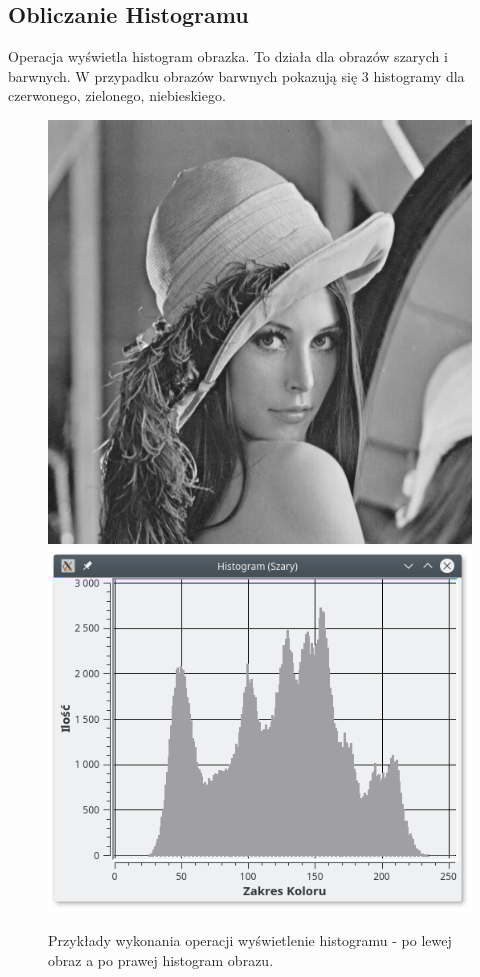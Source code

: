 \documentclass{article}
\begin{document}
\FloatBarrier
\subsection{Obliczanie Histogramu}
Operacja wyświetla histogram obrazka. To działa dla obrazów szarych i barwnych. W przypadku obrazów barwnych pokazują się 3 histogramy dla czerwonego, zielonego, niebieskiego.
\begin{figure}[!htb]
\centering
\includegraphics[scale=0.2]{img/lena_8bit.png}
\includegraphics[scale=0.3]{img/histogram.png} 
\caption{Przykłady wykonania operacji wyświetlenie histogramu - po lewej obraz a po prawej histogram obrazu. }
\end{figure}
\end{document}
